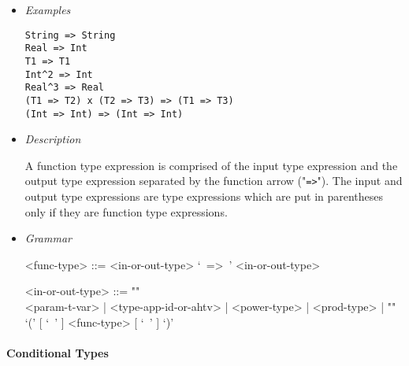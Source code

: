\documentclass[diploma]{softlab-thesis}
\begin{document}
\begin{itemize}
\item \textit{Examples}
\begin{verbatim}
String => String
Real => Int
T1 => T1
Int^2 => Int
Real^3 => Real
(T1 => T2) x (T2 => T3) => (T1 => T3)
(Int => Int) => (Int => Int)
\end{verbatim}

\item \textit{Description}

A function type expression is comprised of the input type expression and the
output type expression separated by the function arrow ("\verb|=>|"). The
input and output type expressions are type expressions which are put in
parentheses only if they are function type expressions.

\item \textit{Grammar}
\begin{grammar}
<func-type> ::= <in-or-out-type> `\ =>\ ' <in-or-out-type>

<in-or-out-type> ::=
""\\
<param-t-var> | <type-app-id-or-ahtv> | <power-type> | <prod-type> | ""\\
`(' [ `\ ' ] <func-type>  [ `\ ' ] `)'
\end{grammar}
\end{itemize}

\newpage

\paragraph{Conditional Types}
\end{document}
